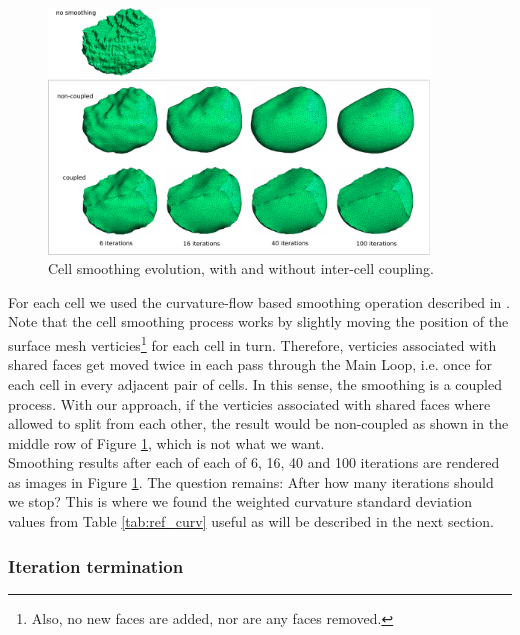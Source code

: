 \documentclass[a4paper,10pt]{article}
\begin{document}
\begin{figure}[H]
\begin{center}
\includegraphics[width=0.9\textwidth]{images/evolution.pdf}
\end{center}
\caption{Cell smoothing evolution, with and without inter-cell coupling.}
\label{fig:cell_morph}
\end{figure}

For each cell we used the curvature-flow based smoothing operation described in \cite{Desbrun:1999:IFI:311535.311576}. Note that the cell smoothing process works by slightly moving the position of the surface mesh verticies\footnote{Also, no new faces are added, nor are any faces removed.} for each cell in turn. Therefore, verticies associated with shared faces get moved twice in each pass through the Main Loop, i.e. once for each cell in every adjacent pair of cells. In this sense, the smoothing is a coupled process. With our approach, if the verticies associated with shared faces where allowed to split from each other, the result would be non-coupled as shown in the middle row of Figure \ref{fig:cell_morph}, which is not what we want.\\

Smoothing results after each of each of 6, 16, 40 and 100 iterations are rendered as images in Figure \ref{fig:cell_morph}.
The question remains: After how many iterations should we stop? This is where we found the weighted curvature standard deviation values from Table \ref{tab:ref_curv} useful as will be described in the next section.\\

\subsubsection{Iteration termination}
\end{document}
